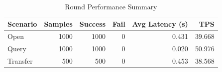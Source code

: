 \begin{table}
\caption{Round Performance Summary}
\label{tab:round_perf}
\begin{tabular}{lrrrrr}
\toprule
Scenario & Samples & Success & Fail & Avg Latency (s) & TPS \\
\midrule
Open & 1000 & 1000 & 0 & 0.431 & 39.668 \\
Query & 1000 & 1000 & 0 & 0.020 & 50.976 \\
Transfer & 500 & 500 & 0 & 0.453 & 38.568 \\
\bottomrule
\end{tabular}
\end{table}
